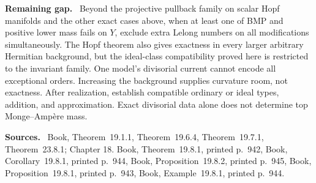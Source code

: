 \documentclass[11pt]{article}
\newcommand{\field}[1]{\par\medskip\noindent\textbf{#1.}\ }
\begin{document}
\field{Remaining gap} Beyond the projective pullback family on scalar Hopf manifolds and the other exact cases above, when at least one of BMP and positive lower mass fails on $Y$, exclude extra Lelong numbers on all modifications simultaneously. The Hopf theorem also gives exactness in every larger arbitrary Hermitian background, but the ideal-class compatibility proved here is restricted to the invariant family. One model's divisorial current cannot encode all exceptional orders. Increasing the background supplies curvature room, not exactness. After realization, establish compatible ordinary or ideal types, addition, and approximation. Exact divisorial data alone does not determine top Monge--Amp\`ere mass.
\field{Sources} Book, Theorem~19.1.1, Theorem~19.6.4, Theorem~19.7.1, Theorem~23.8.1; Chapter 18. Book, Theorem~19.8.1, printed p.~942, Book, Corollary~19.8.1, printed p.~944, Book, Proposition~19.8.2, printed p.~945, Book, Proposition~19.8.1, printed p.~943, Book, Example~19.8.1, printed p.~944.
\end{document}
